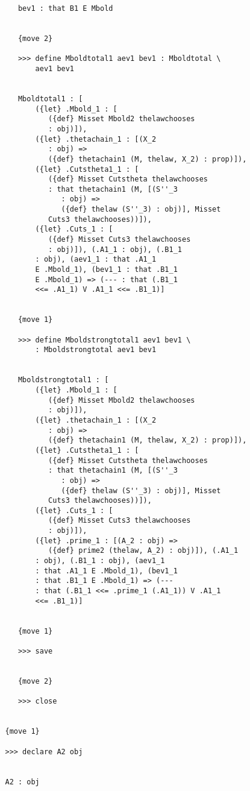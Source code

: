 \documentclass[12pt]{article}
\begin{document}
\begin{verbatim}
      bev1 : that B1 E Mbold


      {move 2}

      >>> define Mboldtotal1 aev1 bev1 : Mboldtotal \
          aev1 bev1


      Mboldtotal1 : [
          ({let} .Mbold_1 : [
             ({def} Misset Mbold2 thelawchooses 
             : obj)]), 
          ({let} .thetachain_1 : [(X_2 
             : obj) => 
             ({def} thetachain1 (M, thelaw, X_2) : prop)]), 
          ({let} .Cutstheta1_1 : [
             ({def} Misset Cutstheta thelawchooses 
             : that thetachain1 (M, [(S''_3 
                : obj) => 
                ({def} thelaw (S''_3) : obj)], Misset 
             Cuts3 thelawchooses))]), 
          ({let} .Cuts_1 : [
             ({def} Misset Cuts3 thelawchooses 
             : obj)]), (.A1_1 : obj), (.B1_1 
          : obj), (aev1_1 : that .A1_1 
          E .Mbold_1), (bev1_1 : that .B1_1 
          E .Mbold_1) => (--- : that (.B1_1 
          <<= .A1_1) V .A1_1 <<= .B1_1)]


      {move 1}

      >>> define Mboldstrongtotal1 aev1 bev1 \
          : Mboldstrongtotal aev1 bev1


      Mboldstrongtotal1 : [
          ({let} .Mbold_1 : [
             ({def} Misset Mbold2 thelawchooses 
             : obj)]), 
          ({let} .thetachain_1 : [(X_2 
             : obj) => 
             ({def} thetachain1 (M, thelaw, X_2) : prop)]), 
          ({let} .Cutstheta1_1 : [
             ({def} Misset Cutstheta thelawchooses 
             : that thetachain1 (M, [(S''_3 
                : obj) => 
                ({def} thelaw (S''_3) : obj)], Misset 
             Cuts3 thelawchooses))]), 
          ({let} .Cuts_1 : [
             ({def} Misset Cuts3 thelawchooses 
             : obj)]), 
          ({let} .prime_1 : [(A_2 : obj) => 
             ({def} prime2 (thelaw, A_2) : obj)]), (.A1_1 
          : obj), (.B1_1 : obj), (aev1_1 
          : that .A1_1 E .Mbold_1), (bev1_1 
          : that .B1_1 E .Mbold_1) => (--- 
          : that (.B1_1 <<= .prime_1 (.A1_1)) V .A1_1 
          <<= .B1_1)]


      {move 1}

      >>> save


      {move 2}

      >>> close


   {move 1}

   >>> declare A2 obj


   A2 : obj



\end{verbatim}
\end{document}
